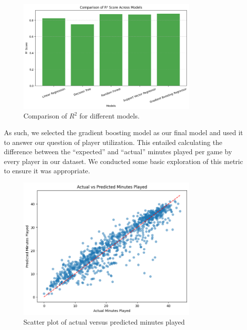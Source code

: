 \documentclass[12pt]{article}
\begin{document}
\begin{figure}[H]
    \centering
    \includegraphics[width=0.8\textwidth]{MM_EP_R2.png}
    \caption{Comparison of $R^2$ for different models.}
    \label{fig:model_comparison}
\end{figure}

As such, we selected the gradient boosting model as our final model and used it to answer our question of player utilization. This entailed calculating the difference between the “expected” and “actual” minutes played per game by every player in our dataset. We conducted some basic exploration of this metric to ensure it was appropriate.

\begin{figure}[H]
    \centering
    \includegraphics[width=0.8\textwidth]{MM_EP_AVPMP.png}
    \caption{Scatter plot of actual versus predicted minutes played}
    \label{fig:feature_selection}
\end{figure}
\end{document}
